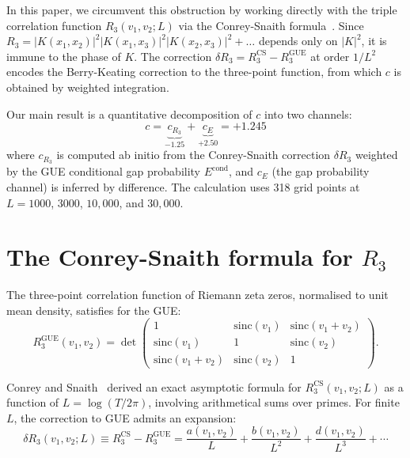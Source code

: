 \documentclass[11pt]{article}
\begin{document}
In this paper, we circumvent this obstruction by working directly with the
triple correlation function $R_3(v_1, v_2; L)$ via the Conrey-Snaith
formula~\cite{conrey2005, conreysnaith2008}. Since
$R_3 = |K(x_1,x_2)|^2 |K(x_1,x_3)|^2 |K(x_2,x_3)|^2 + \ldots$ depends
only on $|K|^2$, it is immune to the phase of $K$. The correction
$\delta R_3 = R_3^{\mathrm{CS}} - R_3^{\mathrm{GUE}}$ at order $1/L^2$
encodes the Berry-Keating correction to the three-point function, from which
$c$ is obtained by weighted integration.

Our main result is a quantitative decomposition of $c$ into two channels:
\begin{equation}
\boxed{c = \underbrace{c_{R_3}}_{-1.25} + \underbrace{c_{E}}_{+2.50} = +1.245}
\label{eq:main}
\end{equation}
where $c_{R_3}$ is computed ab initio from the Conrey-Snaith correction
$\delta R_3$ weighted by the GUE conditional gap probability $E^{\mathrm{cond}}$,
and $c_E$ (the gap probability channel) is inferred by difference.
The calculation uses 318 grid points at $L = 1000$, $3000$, $10{,}000$, and $30{,}000$.


\section{The Conrey-Snaith formula for $R_3$}

The three-point correlation function of Riemann zeta zeros, normalised to
unit mean density, satisfies for the GUE:
\begin{equation}
R_3^{\mathrm{GUE}}(v_1, v_2) = \det\begin{pmatrix}
1 & \mathrm{sinc}(v_1) & \mathrm{sinc}(v_1{+}v_2) \\
\mathrm{sinc}(v_1) & 1 & \mathrm{sinc}(v_2) \\
\mathrm{sinc}(v_1{+}v_2) & \mathrm{sinc}(v_2) & 1
\end{pmatrix}.
\label{eq:R3GUE}
\end{equation}

Conrey and Snaith~\cite{conrey2005, conreysnaith2008} derived an exact
asymptotic formula for $R_3^{\mathrm{CS}}(v_1, v_2; L)$ as a function of
$L = \log(T/2\pi)$, involving arithmetical sums over primes. For finite $L$,
the correction to GUE admits an expansion:
\begin{equation}
\delta R_3(v_1, v_2; L) \equiv R_3^{\mathrm{CS}} - R_3^{\mathrm{GUE}}
= \frac{a(v_1, v_2)}{L} + \frac{b(v_1, v_2)}{L^2} + \frac{d(v_1, v_2)}{L^3} + \cdots
\label{eq:expansion}
\end{equation}
\end{document}
